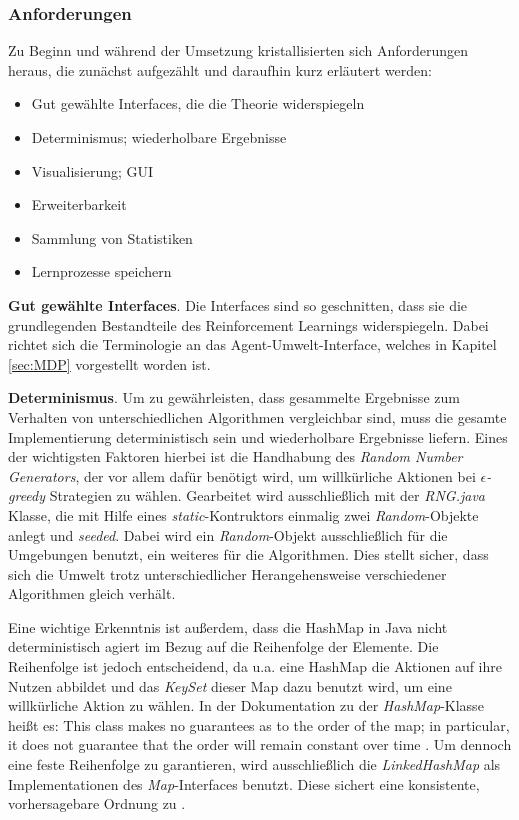 

\subsubsection{Anforderungen}
Zu Beginn und während der Umsetzung kristallisierten sich Anforderungen heraus, die zunächst aufgezählt und daraufhin kurz erläutert werden:

\begin{itemize}
    \item Gut gewählte Interfaces, die die Theorie widerspiegeln
    \item Determinismus; wiederholbare Ergebnisse
    \item Visualisierung; GUI
    \item Erweiterbarkeit
    \item Sammlung von Statistiken
    \item Lernprozesse speichern
\end{itemize}

\textbf{Gut gewählte Interfaces}. Die Interfaces sind so geschnitten, dass sie die grundlegenden Bestandteile des Reinforcement Learnings widerspiegeln. Dabei richtet sich die Terminologie an das Agent-Umwelt-Interface, welches in Kapitel \ref{sec:MDP} vorgestellt worden ist. 
\par 
\textbf{Determinismus}. Um zu gewährleisten, dass gesammelte Ergebnisse zum Verhalten von unterschiedlichen Algorithmen vergleichbar sind, muss die gesamte Implementierung deterministisch sein und wiederholbare Ergebnisse liefern. Eines der wichtigsten Faktoren hierbei ist die Handhabung des \textit{Random Number Generators}, der vor allem dafür benötigt wird, um \glqq willkürliche\grqq{} Aktionen bei $\epsilon$\textit{-greedy} Strategien zu wählen. Gearbeitet wird ausschließlich mit der \textit{RNG.java} Klasse, die mit Hilfe eines \textit{static}-Kontruktors einmalig zwei \textit{Random}-Objekte anlegt und \textit{seeded}. Dabei wird ein \textit{Random}-Objekt ausschließlich für die Umgebungen benutzt, ein weiteres für die Algorithmen. Dies stellt sicher, dass sich die Umwelt trotz unterschiedlicher Herangehensweise verschiedener Algorithmen gleich verhält. 
\par 
Eine wichtige Erkenntnis ist außerdem, dass die HashMap in Java nicht deterministisch agiert im Bezug auf die Reihenfolge der Elemente. Die Reihenfolge ist jedoch entscheidend, da u.a. eine HashMap die Aktionen auf ihre Nutzen abbildet und das \textit{KeySet} dieser Map dazu benutzt wird, um eine willkürliche Aktion zu wählen. In der Dokumentation zu der \textit{HashMap}-Klasse heißt es: \glqq This class makes no guarantees as to the order of the map; in particular, it does not guarantee that the order will remain constant over time \grqq{}\cite{hashmap}.
Um dennoch eine feste Reihenfolge zu garantieren, wird ausschließlich die \textit{LinkedHashMap} als Implementationen des \textit{Map}-Interfaces benutzt. Diese sichert eine konsistente, vorhersagebare Ordnung zu \cite[]{linkedHashMap}.

